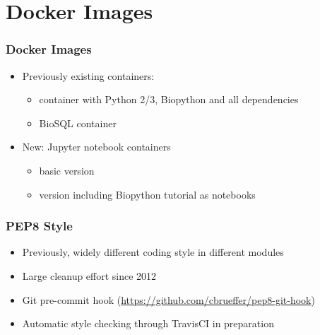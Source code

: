 \documentclass[trans]{beamer}
\begin{document}
\section{Docker Images}
\frame
{
  \frametitle{Docker Images}

  \begin{itemize}
  \item Previously existing containers:
    \begin{itemize}
    \item container with Python 2/3, Biopython and all dependencies
    \item BioSQL container
  \end{itemize}
  \item New: Jupyter notebook containers
    \begin{itemize}
      \item basic version
      \item version including Biopython tutorial as notebooks
    \end{itemize}
  \end{itemize}
}


\frame
{
  \frametitle{PEP8 Style}
  
  \begin{itemize}
  \item Previously, widely different coding style in different modules
  \item Large cleanup effort since 2012
  \item Git pre-commit hook (\url{https://github.com/cbrueffer/pep8-git-hook})
  \item Automatic style checking through TravisCI in preparation
  \end{itemize}
}
\end{document}
